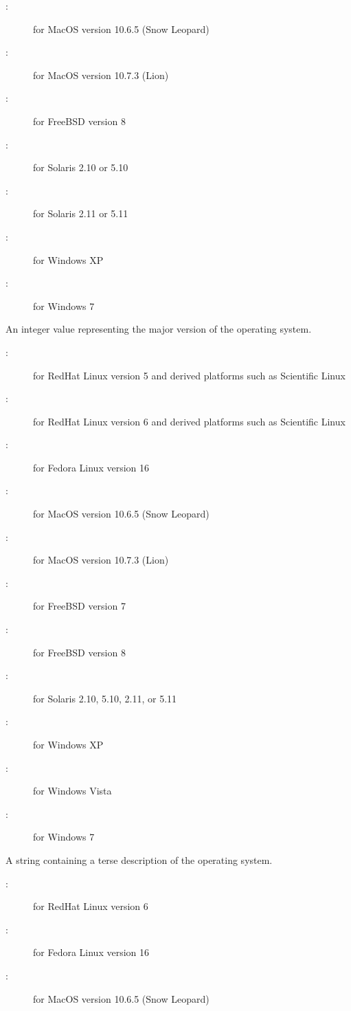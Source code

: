 \begin{description}
\begin{description}
	\item[:] for MacOS version 10.6.5 (Snow Leopard)
	\item[:] for MacOS version 10.7.3 (Lion)
	\item[:] for FreeBSD version 8
	\item[:] for Solaris 2.10 or 5.10
	\item[:] for Solaris 2.11 or 5.11
	\item[:] for Windows XP
	\item[:] for Windows 7
	\end{description}
%
\item[\AdAttr{OpSysMajorVersion}:] An integer value representing the major version of the operating system.
	\begin{description}
	\item[:] for RedHat Linux version 5 
and derived platforms such as Scientific Linux
	\item[:] for RedHat Linux version 6
and derived platforms such as Scientific Linux
	\item[:] for Fedora Linux version 16
	\item[:] for MacOS version 10.6.5 (Snow Leopard)
	\item[:] for MacOS version 10.7.3 (Lion)
	\item[:] for FreeBSD version 7
	\item[:] for FreeBSD version 8
	\item[:] for Solaris 2.10, 5.10, 2.11, or 5.11
	\item[:] for Windows XP
	\item[:] for Windows Vista
	\item[:] for Windows 7
	\end{description}
%
\item[\AdAttr{OpSysName}:] A string containing a terse description of the operating system.
	\begin{description}
	\item[:] for RedHat Linux version 6
	\item[:] for Fedora Linux version 16
	\item[:] for MacOS version 10.6.5 (Snow Leopard)

\end{description}
\end{description}
